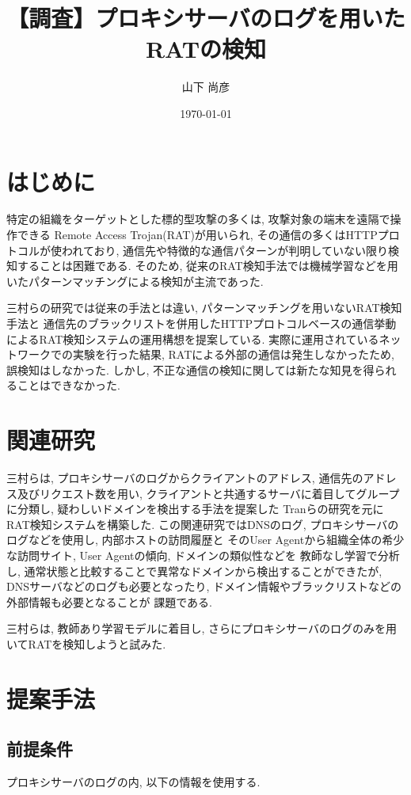 \documentclass[twocolumn,10pt]{ltjsarticle}
\title{【調査】プロキシサーバのログを用いたRATの検知}
\author{山下 尚彦}
\date{\today}
\begin{document}
\maketitle

\section{はじめに}
特定の組織をターゲットとした標的型攻撃の多くは, 攻撃対象の端末を遠隔で操作できる
Remote Access Trojan(RAT)が用いられ, その通信の多くはHTTPプロトコルが使われており, 
通信先や特徴的な通信パターンが判明していない限り検知することは困難である. 
そのため, 従来のRAT検知手法では機械学習などを用いたパターンマッチングによる検知が主流であった. \par
三村らの研究\cite{三村守2016http}では従来の手法とは違い, パターンマッチングを用いないRAT検知手法と
通信先のブラックリストを併用したHTTPプロトコルベースの通信挙動によるRAT検知システムの運用構想を提案している. 
実際に運用されているネットワークでの実験を行った結果, RATによる外部の通信は発生しなかったため, 
誤検知はしなかった. しかし, 不正な通信の検知に関しては新たな知見を得られることはできなかった. 

\section{関連研究}
三村らは, プロキシサーバのログからクライアントのアドレス, 通信先のアドレス及びリクエスト数を用い, 
クライアントと共通するサーバに着目してグループに分類し, 疑わしいドメインを検出する手法を提案した
Tranらの研究\cite{tran2014supplementary}を元にRAT検知システムを構築した. 
この関連研究ではDNSのログ, プロキシサーバのログなどを使用し, 内部ホストの訪問履歴と
そのUser Agentから組織全体の希少な訪問サイト, User Agentの傾向, ドメインの類似性などを
教師なし学習で分析し, 通常状態と比較することで異常なドメインから検出することができたが, 
DNSサーバなどのログも必要となったり, ドメイン情報やブラックリストなどの外部情報も必要となることが
課題である. \par
三村らは, 教師あり学習モデルに着目し, さらにプロキシサーバのログのみを用いてRATを検知しようと試みた. 

\section{提案手法}
\subsection{前提条件}
プロキシサーバのログの内, 以下の情報を使用する. 
\end{document}
